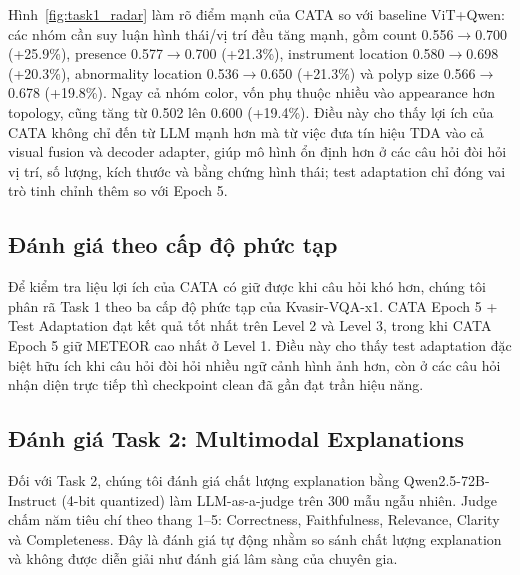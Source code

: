 \documentclass[11pt,a4paper]{article}
\begin{document}
Hình~\ref{fig:task1_radar} làm rõ điểm mạnh của CATA so với baseline ViT+Qwen: các nhóm cần suy luận hình thái/vị trí đều tăng mạnh, gồm count 0.556$\rightarrow$0.700 (+25.9\%), presence 0.577$\rightarrow$0.700 (+21.3\%), instrument location 0.580$\rightarrow$0.698 (+20.3\%), abnormality location 0.536$\rightarrow$0.650 (+21.3\%) và polyp size 0.566$\rightarrow$0.678 (+19.8\%). Ngay cả nhóm color, vốn phụ thuộc nhiều vào appearance hơn topology, cũng tăng từ 0.502 lên 0.600 (+19.4\%). Điều này cho thấy lợi ích của CATA không chỉ đến từ LLM mạnh hơn mà từ việc đưa tín hiệu TDA vào cả visual fusion và decoder adapter, giúp mô hình ổn định hơn ở các câu hỏi đòi hỏi vị trí, số lượng, kích thước và bằng chứng hình thái; test adaptation chỉ đóng vai trò tinh chỉnh thêm so với Epoch 5.

\subsection{Đánh giá theo cấp độ phức tạp}

Để kiểm tra liệu lợi ích của CATA có giữ được khi câu hỏi khó hơn, chúng tôi phân rã Task 1 theo ba cấp độ phức tạp của Kvasir-VQA-x1. CATA Epoch 5 + Test Adaptation đạt kết quả tốt nhất trên Level 2 và Level 3, trong khi CATA Epoch 5 giữ METEOR cao nhất ở Level 1. Điều này cho thấy test adaptation đặc biệt hữu ích khi câu hỏi đòi hỏi nhiều ngữ cảnh hình ảnh hơn, còn ở các câu hỏi nhận diện trực tiếp thì checkpoint clean đã gần đạt trần hiệu năng.


\subsection{Đánh giá Task 2: Multimodal Explanations}

Đối với Task 2, chúng tôi đánh giá chất lượng explanation bằng Qwen2.5-72B-Instruct (4-bit quantized) làm LLM-as-a-judge trên 300 mẫu ngẫu nhiên. Judge chấm năm tiêu chí theo thang 1--5: Correctness, Faithfulness, Relevance, Clarity và Completeness. Đây là đánh giá tự động nhằm so sánh chất lượng explanation và không được diễn giải như đánh giá lâm sàng của chuyên gia.
\end{document}

